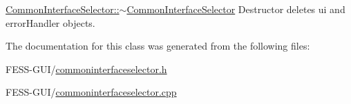 \hyperlink{class_common_interface_selector_acee1f5895e8678895f18edb5941f9160}{Common\+Interface\+Selector\+::$\sim$\+Common\+Interface\+Selector} Destructor deletes ui and error\+Handler objects. 



The documentation for this class was generated from the following files\+:\begin{DoxyCompactItemize}
\item 
F\+E\+S\+S-\/\+G\+U\+I/\hyperlink{commoninterfaceselector_8h}{commoninterfaceselector.\+h}\item 
F\+E\+S\+S-\/\+G\+U\+I/\hyperlink{commoninterfaceselector_8cpp}{commoninterfaceselector.\+cpp}\end{DoxyCompactItemize}

